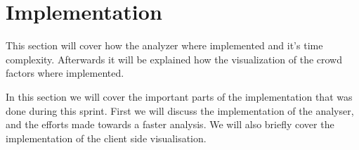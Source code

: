\section{Implementation}
This section will cover how the analyzer where implemented and it's time complexity. Afterwards it will be explained how the visualization of the crowd factors where implemented.

In this section we will cover the important parts of the implementation that was done during this sprint. First we will discuss the implementation of the analyser, and the efforts made towards a faster analysis. We will also briefly cover the implementation of the client side visualisation.



